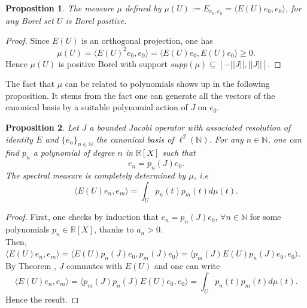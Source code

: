 \documentclass[10pt]{book}
\let\int\int
\theoremstyle{break}
\newtheorem{proposition}{Proposition}
\begin{document}
\begin{proposition}
The measure $\mu$ defined by $\mu(U):=E_{e_0,e_0}=\langle E(U)e_0,e_0 \rangle$, for any Borel set $U$ is Borel positive.
\end{proposition}
\begin{proof}
Since $E(U)$ is an orthogonal projection, one has 
\begin{equation}
\mu(U)=\langle E(U)^2e_0,e_0  \rangle=\langle E(U)e_0,E(U)e_0\rangle\ge0. 
\end{equation}
Hence $\mu(U)$ is positive Borel with support $supp(\mu)\subseteq[-||J||,||J||]$. 
\end{proof}
The fact that $\mu$ can be related to polynomials shows up in the following proposition. It stems from the fact one can generate all the vectors of the canonical basis by a suitable polynomial action of $J$ on $e_0$.
\begin{proposition}
Let $J$ a bounded Jacobi operator with associated resolution of identity $E$ and $\{e_n\}_{n\in\mathbb{N}}$ the canonical basis of $\ell^2(\mathbb{N})$. For any $n\in\mathbb{N}$, one can find $p_n$ a polynomial of degree $n$ in $\mathbb{R}[X]$ such that
\begin{equation}
e_n=p_n(J)e_0.
\end{equation}
The spectral measure is completely determined by $\mu$, i.e
\begin{equation}
\langle E(U)e_n,e_m \rangle=\int_{U}p_n(t)p_m(t)d\mu(t).
\end{equation}
\end{proposition}
\begin{proof}
First, one checks by induction that $e_n=p_n(J)e_0$, $\forall n\in\mathbb{N}$ for some polynomials $p_n\in\mathbb{R}[X]$, thanks to $a_n>0$. \\
Then, $\langle E(U)e_n,e_m \rangle=\langle E(U)p_n(J)e_0,p_m(J)e_0\rangle=\langle p_m(J)E(U)p_n(J)e_0,e_0\rangle$. By Theorem %
, $J$ commutes with $E(U)$ and one can write 
\begin{equation}
\langle E(U)e_n,e_m \rangle=\langle p_m(J)p_n(J)E(U)e_0,e_0\rangle=\int_{U}p_n(t)p_m(t)d\mu(t).
\end{equation}
Hence the result.
\end{proof}
\end{document}
